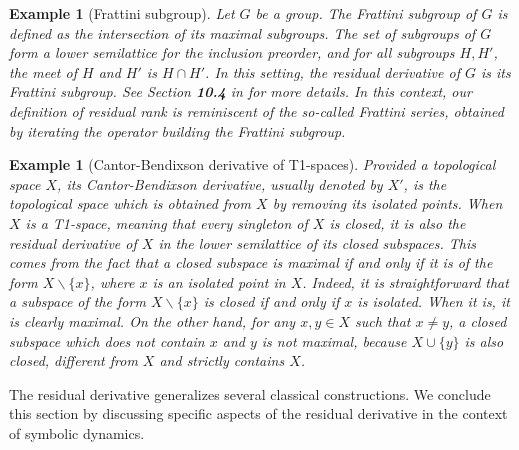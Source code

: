 \documentclass{article}
\newcommand{\blue}{\color{blue}}
\newtheorem{example}[theorem]{Example}
\begin{document}
\begin{example}[Frattini subgroup]
    Let $G$ be a group. The Frattini subgroup of $G$ is defined as the intersection of its maximal subgroups. The set of subgroups of $G$ form a lower semilattice for the inclusion preorder, and for all subgroups $H,H'$, the meet of $H$ and $H'$ is $H \cap H'$. In this setting, the residual derivative of $G$ is its Frattini subgroup. See Section \textbf{10.4} in \cite{Hall1959} for more details. In this context, our definition of residual rank is reminiscent of the so-called Frattini series, obtained by iterating the operator building the Frattini subgroup. 
\end{example}
 
\begin{example}[Cantor-Bendixson derivative of T1-spaces]\label{example.cb.derivative}
Provided a topological space $X$, its \textit{Cantor-Bendixson derivative}, usually denoted by $X'$, is the topological space which is obtained from $X$ by removing its isolated points. When $X$ is a T1-space, meaning that every singleton of $X$ is closed, it is also the residual derivative of $X$ in the lower semilattice of its closed subspaces. This comes from the fact that a closed subspace is maximal if and only if it is of the form $X \backslash \{x\}$, where $x$ is an isolated point in $X$. Indeed, it is straightforward that a subspace of the form $X \backslash \{x\}$ is closed if and only if $x$ is isolated. When it is, it is clearly maximal. On the other hand, for any $x, y \in X$ such that $x \neq y$, a closed subspace which does not contain $x$ and $y$ is not maximal, because $X \cup \{y\}$ is also closed, different from $X$ and strictly contains $X$.
\end{example}

The 
residual derivative {\blue} generalizes several classical constructions. We conclude this section by discussing {specific aspects of the residual derivative in the context of symbolic dynamics.} 
\end{document}
